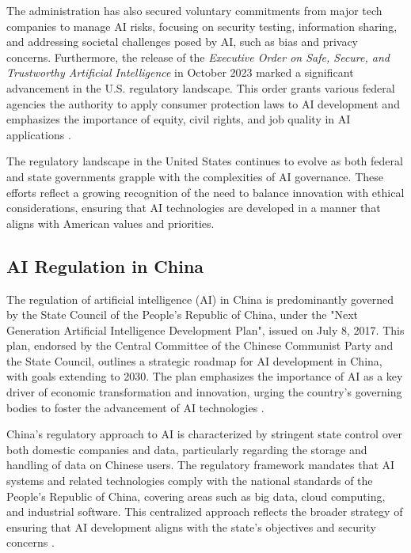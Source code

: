 The administration has also secured voluntary commitments from major tech companies to manage AI risks, focusing on security testing, information sharing, and addressing societal challenges posed by AI, such as bias and privacy concerns. Furthermore, the release of the \textit{Executive Order on Safe, Secure, and Trustworthy Artificial Intelligence} in October 2023 marked a significant advancement in the U.S. regulatory landscape. This order grants various federal agencies the authority to apply consumer protection laws to AI development and emphasizes the importance of equity, civil rights, and job quality in AI applications \cite{biden_executive_order_ai_2023}.

The regulatory landscape in the United States continues to evolve as both federal and state governments grapple with the complexities of AI governance. These efforts reflect a growing recognition of the need to balance innovation with ethical considerations, ensuring that AI technologies are developed in a manner that aligns with American values and priorities.

\subsection{AI Regulation in China}

The regulation of artificial intelligence (AI) in China is predominantly governed by the State Council of the People's Republic of China, under the "Next Generation Artificial Intelligence Development Plan", issued on July 8, 2017. This plan, endorsed by the Central Committee of the Chinese Communist Party and the State Council, outlines a strategic roadmap for AI development in China, with goals extending to 2030. The plan emphasizes the importance of AI as a key driver of economic transformation and innovation, urging the country's governing bodies to foster the advancement of AI technologies \cite{china_ai_plan_2017}.

China's regulatory approach to AI is characterized by stringent state control over both domestic companies and data, particularly regarding the storage and handling of data on Chinese users. The regulatory framework mandates that AI systems and related technologies comply with the national standards of the People's Republic of China, covering areas such as big data, cloud computing, and industrial software. This centralized approach reflects the broader strategy of ensuring that AI development aligns with the state's objectives and security concerns \cite{wu2020towards}.


